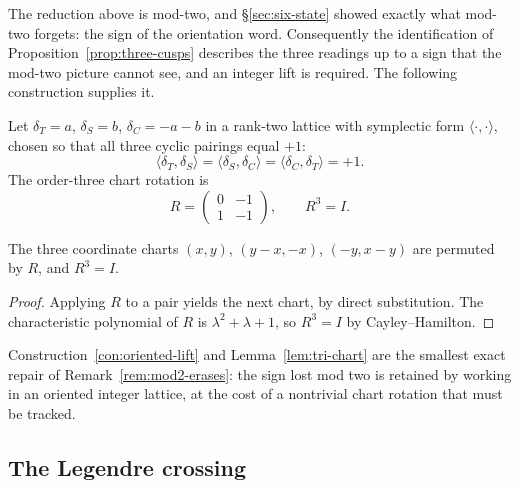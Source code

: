 \begin{remark}\label{rem:mod2-erases}
The reduction above is mod-two, and \S\ref{sec:six-state} showed exactly what
mod-two forgets: the sign of the orientation word.  Consequently the identification of
Proposition~\ref{prop:three-cusps} describes the three readings up to a sign that the
mod-two picture cannot see, and an integer lift is required.  The following
construction supplies it.
\end{remark}

\begin{construction}\label{con:oriented-lift}
Let $\delta_T=a$, $\delta_S=b$, $\delta_C=-a-b$ in a rank-two lattice with symplectic
form $\langle\cdot,\cdot\rangle$, chosen so that all three cyclic pairings equal $+1$:
\[
  \langle\delta_T,\delta_S\rangle=\langle\delta_S,\delta_C\rangle
  =\langle\delta_C,\delta_T\rangle=+1 .
\]
The order-three chart rotation is
\[
  R=\begin{pmatrix}0&-1\\ 1&-1\end{pmatrix},\qquad R^{3}=I .
\]
\end{construction}

\begin{lemma}\label{lem:tri-chart}
The three coordinate charts $(x,y)$, $(y-x,-x)$, $(-y,x-y)$ are permuted by $R$, and
$R^{3}=I$.
\end{lemma}

\begin{proof}
Applying $R$ to a pair yields the next chart, by direct substitution.  The
characteristic polynomial of $R$ is $\lambda^{2}+\lambda+1$, so $R^{3}=I$ by
Cayley--Hamilton.
\end{proof}

\begin{remark}
Construction~\ref{con:oriented-lift} and Lemma~\ref{lem:tri-chart} are the smallest exact
repair of Remark~\ref{rem:mod2-erases}: the sign lost mod two is retained by working in
an oriented integer lattice, at the cost of a nontrivial chart rotation that must be
tracked.
\end{remark}

\subsection{The Legendre crossing}

